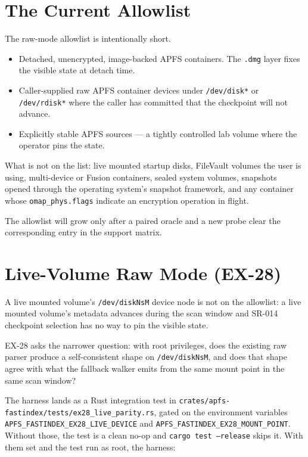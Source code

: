 \section{The Current Allowlist}

The raw-mode allowlist is intentionally short.

\begin{itemize}
  \item Detached, unencrypted, image-backed APFS containers. The
    \texttt{.dmg} layer fixes the visible state at detach time.
  \item Caller-supplied raw APFS container devices under
    \texttt{/dev/disk*} or \texttt{/dev/rdisk*} where the caller
    has committed that the checkpoint will not advance.
  \item Explicitly stable APFS sources --- a tightly controlled lab
    volume where the operator pins the state.
\end{itemize}

What is not on the list: live mounted startup disks, FileVault
volumes the user is using, multi-device or Fusion containers,
sealed system volumes, snapshots opened through the operating
system's snapshot framework, and any container whose
\texttt{omap\_phys.flags} indicate an encryption operation in
flight.

The allowlist will grow only after a paired oracle and a new probe
clear the corresponding entry in the support matrix.

\section{Live-Volume Raw Mode (EX-28)}
\label{sec:ex28-live-raw}

A live mounted volume's \texttt{/dev/diskNsM} device node is not
on the allowlist: a live mounted volume's metadata advances during
the scan window and SR-014 checkpoint selection has no way to pin
the visible state.

EX-28 asks the narrower question: with root privileges, does the
existing raw parser produce a self-consistent shape on
\texttt{/dev/diskNsM}, and does that shape agree with what the
fallback walker emits from the same mount point in the same scan
window?

The harness lands as a Rust integration test in
\texttt{crates/apfs-fastindex/tests/ex28\_live\_parity.rs},
gated on the environment variables
\texttt{APFS\_FASTINDEX\_EX28\_LIVE\_DEVICE} and
\texttt{APFS\_FASTINDEX\_EX28\_MOUNT\_POINT}. Without those, the
test is a clean no-op and \texttt{cargo test --release} skips it.
With them set and the test run as root, the harness:

